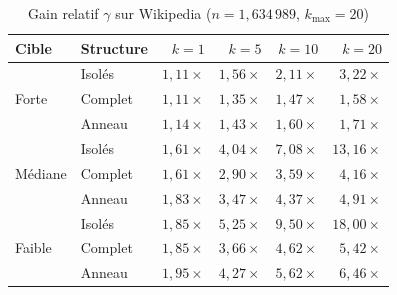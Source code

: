 \documentclass[12pt,a4paper]{article}
\theoremstyle{definition}
\begin{document}
\begin{table}[H]
\centering
\caption{Gain relatif $\gamma$ sur Wikipedia ($n = 1{,}634\,989$, $k_\text{max}=20$)}
\label{tab:wikipedia}
\small
\begin{tabular}{llrrrr}
\toprule
\textbf{Cible} & \textbf{Structure} & $k=1$ & $k=5$ & $k=10$ & $k=20$ \\
\midrule
\multirow{3}{*}{Forte}
 & Isol\'{e}s  & $1{,}11\times$ & $1{,}56\times$ & $2{,}11\times$ & $3{,}22\times$ \\
 & Complet & $1{,}11\times$ & $1{,}35\times$ & $1{,}47\times$ & $1{,}58\times$ \\
 & Anneau  & $1{,}14\times$ & $1{,}43\times$ & $1{,}60\times$ & $1{,}71\times$ \\
\midrule
\multirow{3}{*}{M\'{e}diane}
 & Isol\'{e}s  & $1{,}61\times$ & $4{,}04\times$ & $7{,}08\times$ & $13{,}16\times$ \\
 & Complet & $1{,}61\times$ & $2{,}90\times$ & $3{,}59\times$ & $4{,}16\times$ \\
 & Anneau  & $1{,}83\times$ & $3{,}47\times$ & $4{,}37\times$ & $4{,}91\times$ \\
\midrule
\multirow{3}{*}{Faible}
 & Isol\'{e}s  & $1{,}85\times$ & $5{,}25\times$ & $9{,}50\times$ & $18{,}00\times$ \\
 & Complet & $1{,}85\times$ & $3{,}66\times$ & $4{,}62\times$ & $5{,}42\times$ \\
 & Anneau  & $1{,}95\times$ & $4{,}27\times$ & $5{,}62\times$ & $6{,}46\times$ \\
\bottomrule
\end{tabular}
\end{table}
\end{document}

